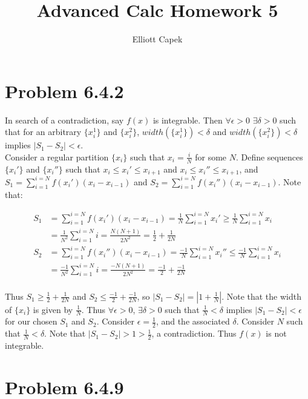\documentclass[10pt]{article} %
\title{Advanced Calc Homework 5}
\author{Elliott Capek}
\begin{document}
\maketitle{}

\section{Problem 6.4.2}
In search of a contradiction, say $f(x)$ is integrable. Then $\forall \epsilon > 0$ $\exists \delta>0$ such that for an arbitrary $\{x_i^1\}$ and $\{x_i^2\}$, $width(\{x_i^1\})<\delta$ and $width(\{x_i^2\})<\delta$ implies $|S_1-S_2|<\epsilon$.\\

Consider a regular partition $\{x_i\}$ such that $x_i = \frac{i}{N}$ for some $N$. Define sequences $\{x_i'\}$ and $\{x_i''\}$ such that $x_i \leq x_i' \leq x_{i+1}$ and $x_i \leq x_i'' \leq x_{i+1}$, and $S_1 = \sum_{i=1}^{i=N}f(x_i')\left(x_i-x_{i-1}\right)$ and $S_2 = \sum_{i=1}^{i=N}f(x_i'')\left(x_i-x_{i-1}\right)$. Note that:

\begin{align*}
  S_1 &= \sum_{i=1}^{i=N}f(x_i')(x_i-x_{i-1}) = \frac{1}{N}\sum_{i=1}^{i=N}x_i' \geq \frac{1}{N}\sum_{i=1}^{i=N}x_i\\
  &= \frac{1}{N^2}\sum_{i=1}^{i=N}i = \frac{N(N+1)}{2N^2} = \frac{1}{2} + \frac{1}{2N}\\
  S_2 &= \sum_{i=1}^{i=N}f(x_i'')(x_i-x_{i-1}) = \frac{-1}{N}\sum_{i=1}^{i=N}x_i'' \leq \frac{-1}{N}\sum_{i=1}^{i=N}x_i\\
  &= \frac{-1}{N^2}\sum_{i=1}^{i=N}i = \frac{-N(N+1)}{2N^2} = \frac{-1}{2} + \frac{-1}{2N}\\
\end{align*}

Thus $S_1 \geq \frac{1}{2} + \frac{1}{2N}$ and $S_2 \leq \frac{-1}{2} + \frac{-1}{2N}$, so $|S_1-S_2| = |1 + \frac{1}{N}|$. Note that the width of $\{x_i\}$ is given by $\frac{1}{N}$. Thus $\forall \epsilon>0$, $\exists \delta > 0$ such that $\frac{1}{N}<\delta$ implies $|S_1-S_2|<\epsilon$ for our chosen $S_1$ and $S_2$. Consider $\epsilon = \frac{1}{2}$, and the associated $\delta$. Consider $N$ such that $\frac{1}{N}<\delta$. Note that $|S_1-S_2|>1>\frac{1}{2}$, a contradiction. Thus $f(x)$ is not integrable.\\

\section{Problem 6.4.9}
\end{document}
